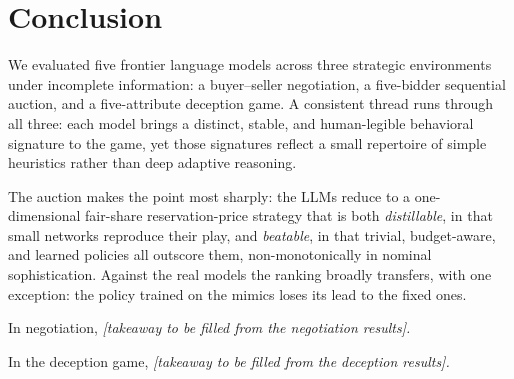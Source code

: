 
\section{Conclusion}
We evaluated five frontier language models across three strategic environments under incomplete information: a buyer--seller negotiation, a five-bidder sequential auction, and a five-attribute deception game. A consistent thread runs through all three: each model brings a distinct, stable, and human-legible behavioral signature to the game, yet those signatures reflect a small repertoire of simple heuristics rather than deep adaptive reasoning. %

The auction makes the point most sharply: the LLMs reduce to a one-dimensional fair-share reservation-price strategy that is both \emph{distillable}, in that small networks reproduce their play, and \emph{beatable}, in that trivial, budget-aware, and learned policies all outscore them, non-monotonically in nominal sophistication. Against the real models the ranking broadly transfers, with one exception: the policy trained on the mimics loses its lead to the fixed ones.

In negotiation, \textit{[takeaway to be filled from the negotiation results].}

In the deception game, \textit{[takeaway to be filled from the deception results].}

